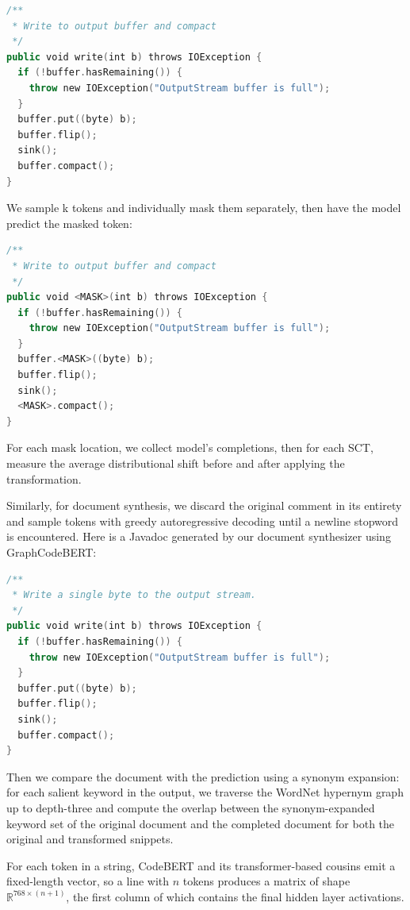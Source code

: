 \documentclass[sigconf,review,anonymous]{acmart}
\begin{document}
  \begin{lstlisting}[basicstyle=\scriptsize\ttfamily, language=kotlin,label={lst:example1}]
/**
 * Write to output buffer and compact
 */
public void write(int b) throws IOException {
  if (!buffer.hasRemaining()) {
    throw new IOException("OutputStream buffer is full");
  }
  buffer.put((byte) b);
  buffer.flip();
  sink();
  buffer.compact();
}
  \end{lstlisting}

  We sample k tokens and individually mask them separately, then have the model predict the masked token:

  \begin{lstlisting}[basicstyle=\scriptsize\ttfamily, language=kotlin,label={lst:example2}]
/**
 * Write to output buffer and compact
 */
public void <MASK>(int b) throws IOException {
  if (!buffer.hasRemaining()) {
    throw new IOException("OutputStream buffer is full");
  }
  buffer.<MASK>((byte) b);
  buffer.flip();
  sink();
  <MASK>.compact();
}
  \end{lstlisting}

  For each mask location, we collect model's completions, then for each SCT, measure the average distributional shift before and after applying the transformation.

  Similarly, for document synthesis, we discard the original comment in its entirety and sample tokens with greedy autoregressive decoding until a newline stopword is encountered. Here is a Javadoc generated by our document synthesizer using GraphCodeBERT:

  \begin{lstlisting}[basicstyle=\scriptsize\ttfamily, language=kotlin,label={lst:example3}]
/**
 * Write a single byte to the output stream.
 */
public void write(int b) throws IOException {
  if (!buffer.hasRemaining()) {
    throw new IOException("OutputStream buffer is full");
  }
  buffer.put((byte) b);
  buffer.flip();
  sink();
  buffer.compact();
}
  \end{lstlisting}

  Then we compare the document with the prediction using a synonym expansion: for each salient keyword in the output, we traverse the WordNet hypernym graph up to depth-three and compute the overlap between the synonym-expanded keyword set of the original document and the completed document for both the original and transformed snippets.

  For each token in a string, CodeBERT and its transformer-based cousins emit a fixed-length vector, so a line with $n$ tokens produces a matrix of shape $\mathbb R^{768 \times (n + 1)}$, the first column of which contains the final hidden layer activations.
\end{document}
